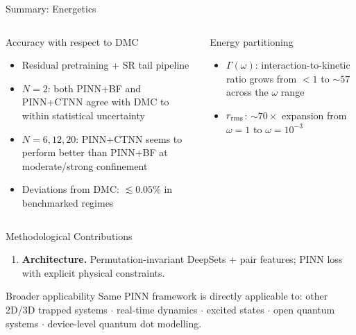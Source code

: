 \documentclass[aspectratio=169,10pt]{beamer}
\begin{document}
\begin{frame}{Summary: Energetics}
  \begin{columns}[T]
      \begin{block}{Accuracy with respect to DMC}
        \begin{itemize}
          \item Residual pretraining + SR tail pipeline
          \item $N=2$: both PINN+BF and PINN+CTNN agree with DMC
                to within statistical uncertainty
          \item $N=6,12,20$: PINN+CTNN seems to perform better than
                PINN+BF at moderate/strong confinement
          \item Deviations from DMC: $\lesssim 0.05\%$ in benchmarked
                regimes
        \end{itemize}
      \end{block}
      \begin{block}{Energy partitioning}
        \begin{itemize}
          \item $\Gamma(\omega)$: interaction-to-kinetic ratio grows
                from $<1$ to $\sim 57$ across the $\omega$ range
          \item $r_{\rm rms}$: $\sim\!70\times$ expansion from
                $\omega=1$ to $\omega=10^{-3}$
        \end{itemize}
      \end{block}
  \end{columns}
\end{frame}


\begin{frame}{Methodological Contributions}
  \begin{enumerate}\itemsep5pt
    \item \textbf{Architecture.}
          Permutation-invariant DeepSets + pair features; PINN loss with explicit
          physical constraints.
  \end{enumerate}

  \vspace{0.3cm}
  \begin{alertblock}{Broader applicability}
    Same PINN framework is directly applicable to:
    other 2D/3D trapped systems $\cdot$ real-time dynamics $\cdot$
    excited states $\cdot$ open quantum systems $\cdot$
    device-level quantum dot modelling.
  \end{alertblock}
\end{frame}
\end{document}
